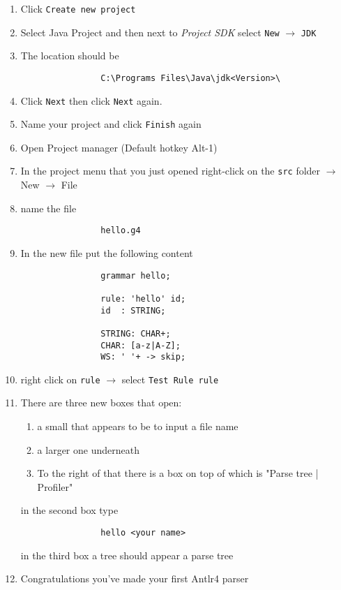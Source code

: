 \documentclass{article}
\begin{document}
		\begin{enumerate}
			\item Click \texttt{Create new project}
			\item Select Java Project and then next to \textit{Project SDK} select \texttt{New} $\rightarrow$ \texttt{JDK}
			\item The location should be
			\begin{lstlisting}
				C:\Programs Files\Java\jdk<Version>\
			\end{lstlisting}
			\item Click \texttt{Next} then click \texttt{Next} again.
			\item Name your project and click \texttt{Finish} again
			\item Open Project manager (Default hotkey Alt-1)
			\item In the project menu that you just opened right-click on the \texttt{src} folder $\rightarrow$ New $\rightarrow$ File
			\item name the file
			\begin{lstlisting}
				hello.g4
			\end{lstlisting}
			\item In the new file put the following content
			\begin{lstlisting}
				grammar hello;

				rule: 'hello' id;
				id  : STRING;

				STRING: CHAR+;
				CHAR: [a-z|A-Z];
				WS: ' '+ -> skip;
			\end{lstlisting}
			\item right click on \texttt{rule} $\rightarrow$ select \texttt{Test Rule rule}
			\item There are three new boxes that open:
			\begin{enumerate}
				\item a small that appears to be to input a file name
				\item a larger one underneath
				\item To the right of that there is a box on top of which is "Parse tree | Profiler"
			\end{enumerate}
			in the second box type
			\begin{lstlisting}
				hello <your name>
			\end{lstlisting}
			in the third box a tree should appear a parse tree
			\item Congratulations you've made your first Antlr4 parser

		\end{enumerate}
\end{document}
